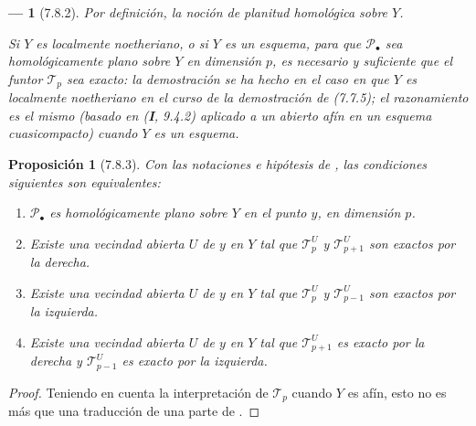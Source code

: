 \documentclass[10pt,oneside,openany]{book}
\theoremstyle{egaenv}\newtheorem*{env}{---}
\theoremstyle{egastatement}
\newtheorem*{proposition}{Proposición}
\theoremstyle{egadescription}
\begin{document}
\begin{env}[7.8.2]
Por definición, la noción de planitud homológica sobre $Y$.

Si $Y$ es localmente noetheriano, o si $Y$ es un esquema, para que
$\mathscr P_\bullet$ sea homológicamente plano sobre $Y$ en
dimensión $p$, es necesario y suficiente que el funtor
$\mathscr T_p$ sea \emph{exacto}: la demostración se ha hecho en el caso en que $Y$ es localmente noetheriano en el curso de la demostración de (7.7.5); el razonamiento es el mismo (basado en (\textbf{I}, 9.4.2) aplicado a un abierto afín en un esquema cuasicompacto) cuando $Y$ es un esquema.
\end{env}

\begin{proposition}[7.8.3]
\label{III.7.8.3}
Con las notaciones e hipótesis de \textup{}, las condiciones
siguientes son equivalentes:
\begin{enumerate}
  \item[\textup{a)}] $\mathscr P_\bullet$ es homológicamente plano sobre $Y$
    en el punto $y$, en dimensión $p$.
  \item[\textup{b)}] Existe una vecindad abierta $U$ de $y$ en $Y$ tal que
    $\mathscr T_p^U$ y $\mathscr T_{p+1}^U$ son exactos por la
    derecha.
  \item[\textup{c)}] Existe una vecindad abierta $U$ de $y$ en $Y$ tal que
    $\mathscr T_p^U$ y $\mathscr T_{p-1}^U$ son exactos por la
    izquierda.
  \item[\textup{d)}] Existe una vecindad abierta $U$ de $y$ en $Y$ tal que
    $\mathscr T_{p+1}^U$ es exacto por la derecha y
    $\mathscr T_{p-1}^U$ es exacto por la izquierda.
\end{enumerate}
\end{proposition}

\begin{proof}
Teniendo en cuenta la interpretación de $\mathscr T_p$ cuando $Y$
es afín, esto no es más que una traducción de una parte de
.
\end{proof}
\end{document}
